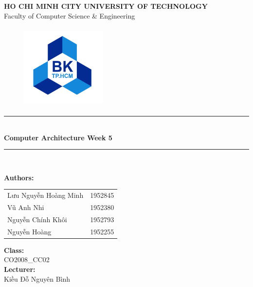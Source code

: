 \documentclass[12pt,a4paper]{article}
\newcommand\HRule{\rule{12cm}{1pt}}
\begin{document}
\begin{titlepage}

  \begin{center}

    \textbf{\fontsize{12pt}{1pt}\selectfont HO CHI MINH CITY UNIVERSITY OF TECHNOLOGY}\\[0.5cm]
    {\fontsize{13pt}{1pt}\selectfont Faculty of Computer Science \& Engineering}\\[0.5cm]
    \begin{figure}[H]
      \centering
      \includegraphics[width=1.7in,height=1.7in]{BK.png}
    \end{figure}

    \HRule\\[0.5cm]
    { \textbf{\fontsize{25pt}{1pt}\selectfont Computer Architecture Week 5}}\\[0.4cm]

    \HRule\\[0.8cm]
    \begin{minipage}{0.545\textwidth}
      \begin{flushleft}
        \textbf{Authors:}\\
        \begin{tabular}{l l}
          Lưu Nguyễn Hoàng Minh & 1952845 \\
          Vũ Anh Nhi            & 1952380 \\
          Nguyễn Chính Khôi     & 1952793 \\
          Nguyễn Hoàng          & 1952255 \\
        \end{tabular}
      \end{flushleft}
    \end{minipage}
    \begin{minipage}{0.4\textwidth}
      \begin{flushright}
        \textbf{Class:}\\
        CO2008\_CC02\\
        \textbf{Lecturer:}\\
        Kiều Đỗ Nguyên Bình\\


\end{flushright}
\end{minipage}
\end{center}
\end{titlepage}
\end{document}

